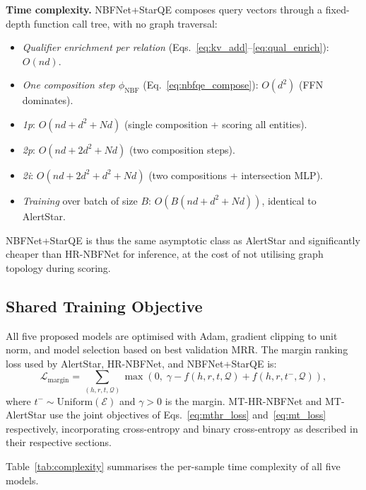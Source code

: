 \documentclass[10pt,journal,compsoc]{IEEEtran}
\begin{document}
\noindent\textbf{Time complexity.}
NBFNet+StarQE composes query vectors through a fixed-depth
function call tree, with no graph traversal:
\begin{itemize}
  \item \emph{Qualifier enrichment per relation}
    (Eqs.~\ref{eq:kv_add}--\ref{eq:qual_enrich}):
    $O(n d)$.
  \item \emph{One composition step $\phi_{\mathrm{NBF}}$}
    (Eq.~\ref{eq:nbfqe_compose}):
    $O(d^2)$ (FFN dominates).
  \item \emph{1p}: $O(n d + d^2 + N d)$
    (single composition + scoring all entities).
  \item \emph{2p}: $O(n d + 2 d^2 + N d)$
    (two composition steps).
  \item \emph{2i}: $O(n d + 2 d^2 + d^2 + N d)$
    (two compositions + intersection MLP).
  \item \emph{Training} over batch of size $B$:
    $O(B (n d + d^2 + N d))$,
    identical to AlertStar.
\end{itemize}
NBFNet+StarQE is thus the same asymptotic class as
AlertStar and significantly cheaper than HR-NBFNet
for inference, at the cost of not utilising graph
topology during scoring.

\subsection{Shared Training Objective}
\label{ssec:training}

All five proposed models are optimised with Adam,
gradient clipping to unit norm, and model selection
based on best validation MRR.
The margin ranking loss used by AlertStar, HR-NBFNet,
and NBFNet+StarQE is:
\begin{equation}
  \mathcal{L}_{\mathrm{margin}}
  = \sum_{(h,r,t,\mathcal{Q})}
    \max\!\left(0,\;
      \gamma
      - f(h,r,t,\mathcal{Q})
      + f(h,r,t^-,\mathcal{Q})
    \right),
  \label{eq:margin_loss_shared}
\end{equation}
where $t^- \sim \mathrm{Uniform}(\mathcal{E})$
and $\gamma > 0$ is the margin.
MT-HR-NBFNet and MT-AlertStar use the joint objectives
of Eqs.~\ref{eq:mthr_loss} and~\ref{eq:mt_loss}
respectively, incorporating cross-entropy and binary
cross-entropy as described in their respective sections.

Table~\ref{tab:complexity} summarises the per-sample
time complexity of all five models.
\end{document}
